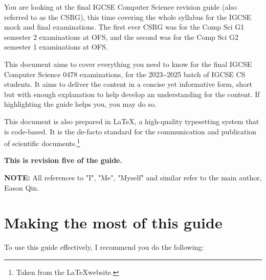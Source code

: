 \documentclass[../main.tex]{subfiles}
\begin{document}
You are looking at the final IGCSE Computer Science revision guide (also referred to as the CSRG), this time covering the whole syllabus for the IGCSE mock and final examinations. The first ever CSRG was for the Comp Sci G1 semester 2 examinations at OFS, and the second was for the Comp Sci G2 semester 1 examinations at OFS.

This document aims to cover everything you need to know for the final IGCSE Computer Science 0478 examinations, for the 2023\textasciitilde2025 batch of IGCSE CS students. It aims to deliver the content in a concise yet informative form, short but with enough explanation to help develop an understanding for the content. If highlighting the guide helps you, you may do so.

This document is also prepared in \LaTeX, a high-quality typesetting system that is code-based. It is the de-facto standard for the communication and publication of scientific documents.\footnote{Taken from the \LaTeX  website.}

\textbf{This is revision five of the guide.}

\textbf{NOTE:} All references to "I", "Me", "Myself" and similar refer to the main author, Eason Qin.

\section*{Making the most of this guide}

To use this guide effectively, I recommend you do the following:
\end{document}
